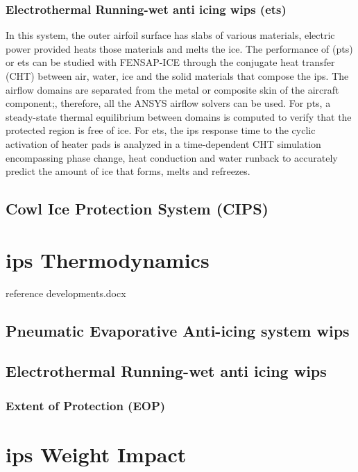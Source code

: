 \documentclass[english]{kththesis}
\begin{document}
\subsubsection{Electrothermal Running-wet anti icing \acrshort{wips} (\acrshort{ets})} 
In this system, the outer airfoil surface has slabs of various materials, electric power provided heats those materials and melts the ice. The performance of (\acrshort{pts}) or \acrshort{ets} can be studied with FENSAP-ICE through the conjugate heat transfer (CHT) between air, water, ice and the solid materials that compose the \acrshort{ips}. The airflow domains are separated from the metal or composite skin of the aircraft component;, therefore, all the ANSYS airflow solvers can be used.
For \acrshort{pts}, a steady-state thermal equilibrium between domains is computed to verify that the protected region is free of ice.
For \acrshort{ets}, the \acrshort{ips} response time to the cyclic activation of heater pads is analyzed in a time-dependent CHT simulation encompassing phase change, heat conduction and water runback to accurately predict the amount of ice that forms,
melts and refreezes. 

\subsection{Cowl Ice Protection System (CIPS)}
\label{subsec:CIPS}
\section{\acrshort{ips} Thermodynamics}
reference developments.docx
\label{sec:mathrep}
\subsection{Pneumatic Evaporative Anti-icing system \acrshort{wips}}
\subsection{Electrothermal Running-wet anti icing \acrshort{wips}}
\subsubsection{Extent of Protection (EOP)}

\section{\acrshort{ips} Weight Impact}
\label{sec:ipswtimpact}
\end{document}
